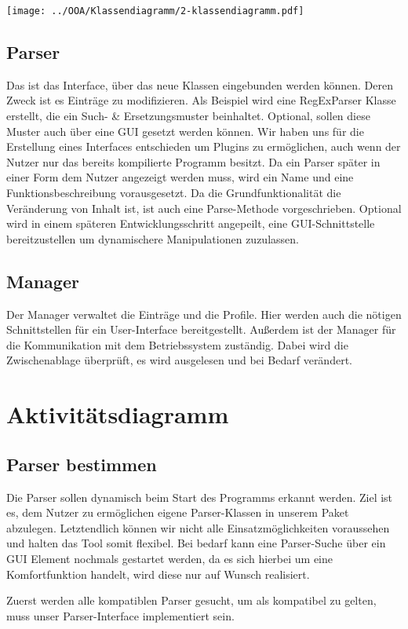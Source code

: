 \documentclass[a4paper,11pt,abstracton,titlepage]{scrartcl}
\begin{document}
\texttt{[image: ../OOA/Klassendiagramm/2-klassendiagramm.pdf]}

\subsection{Parser}
Das ist das Interface, über das neue Klassen eingebunden werden können. Deren
Zweck ist es Einträge zu modifizieren. Als Beispiel wird eine RegExParser Klasse
erstellt, die ein Such- & Ersetzungsmuster beinhaltet. Optional, sollen diese
Muster auch über eine GUI gesetzt werden können.
Wir haben uns für die Erstellung eines Interfaces entschieden um Plugins zu
ermöglichen, auch wenn der Nutzer nur das bereits kompilierte Programm besitzt.
Da ein Parser später in einer Form dem Nutzer angezeigt werden muss, wird ein
Name und eine Funktionsbeschreibung vorausgesetzt. Da die Grundfunktionalität
die Veränderung von Inhalt ist, ist auch eine Parse-Methode vorgeschrieben.
Optional wird in einem späteren Entwicklungsschritt angepeilt, eine
GUI-Schnittstelle bereitzustellen um dynamischere Manipulationen zuzulassen.

\subsection{Manager}
Der Manager verwaltet die Einträge und die Profile. Hier werden auch die nötigen
Schnittstellen für ein User-Interface bereitgestellt. Außerdem ist der Manager
für die Kommunikation mit dem Betriebssystem zuständig. Dabei wird die
Zwischenablage überprüft, es wird ausgelesen und bei Bedarf verändert.

\section{Aktivitätsdiagramm}
\subsection{Parser bestimmen}
Die Parser sollen dynamisch beim Start des Programms erkannt werden. Ziel ist
es, dem Nutzer zu ermöglichen eigene Parser-Klassen in unserem Paket abzulegen.
Letztendlich können wir nicht alle Einsatzmöglichkeiten voraussehen und halten
das Tool somit flexibel. Bei bedarf kann eine Parser-Suche über ein GUI Element
nochmals gestartet werden, da es sich hierbei um eine Komfortfunktion handelt,
wird diese nur auf Wunsch realisiert.

Zuerst werden alle kompatiblen Parser gesucht, um als kompatibel zu gelten, muss
unser Parser-Interface implementiert sein.
\end{document}
